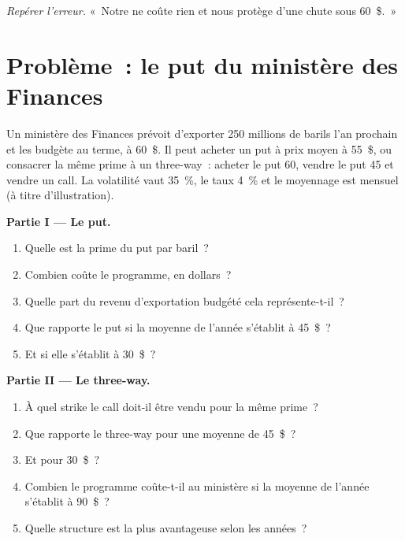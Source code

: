 \begin{exercise}[$\star\star\star$]\label{exo:m3:commodity-options-and-structured-hedges:8}
\emph{Repérer l'erreur.} «~Notre  ne coûte rien et nous protège d'une chute sous 60~\$.~»
\end{exercise}

\section{Problème~: le put du ministère des Finances}

\begin{problem}\label{pb:m3:commodity-options-and-structured-hedges:1}
Un ministère des Finances prévoit d'exporter 250 millions de barils l'an prochain et les budgète au terme, à 60~\$. Il
peut acheter un put à prix moyen à 55~\$, ou consacrer la même prime à un three-way~: acheter le put 60, vendre le put 45
et vendre un call. La volatilité vaut 35~\%, le taux 4~\% et le moyennage est mensuel (à titre d'illustration).

\medskip\noindent\textbf{Partie I --- Le put.}
\begin{enumerate}
\item Quelle est la prime du put par baril~?
\item Combien coûte le programme, en dollars~?
\item Quelle part du revenu d'exportation budgété cela représente-t-il~?
\item Que rapporte le put si la moyenne de l'année s'établit à 45~\$~?
\item Et si elle s'établit à 30~\$~?
\end{enumerate}

\medskip\noindent\textbf{Partie II --- Le three-way.}
\begin{enumerate}[resume]
\item À quel strike le call doit-il être vendu pour la même prime~?
\item Que rapporte le three-way pour une moyenne de 45~\$~?
\item Et pour 30~\$~?
\item Combien le programme coûte-t-il au ministère si la moyenne de l'année s'établit à 90~\$~?
\item Quelle structure est la plus avantageuse selon les années~?
\end{enumerate}


\end{problem}
